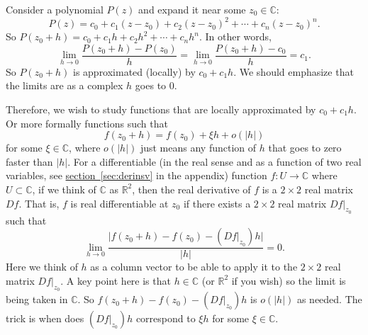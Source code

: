 \documentclass[12pt,openany]{book}
\newcommand{\sabs}[1]{\lvert {#1} \rvert}
\newcommand{\C}{{\mathbb{C}}}
\newcommand{\R}{{\mathbb{R}}}
\theoremstyle{plain}
\theoremstyle{remark}
\theoremstyle{definition}
\theoremstyle{exercise}
\theoremstyle{example}
\newcommand{\sectionref}[1]{\hyperref[#1]{section~\ref*{#1}}}
\begin{document}
Consider a polynomial $P(z)$ and expand it near some $z_0 \in \C$:
\begin{equation*}
P(z) = c_0 + c_1 (z-z_0) + c_2 {(z-z_0)}^2 + \cdots + c_n {(z-z_0)}^n .
\end{equation*}
So $P(z_0+h) = c_0 + c_1 h + c_2 h^2 + \cdots + c_n h^n$.
In other words,
\begin{equation*}
\lim_{h \to 0} \frac{P(z_0+h) - P(z_0)}{h} =
\lim_{h \to 0} \frac{P(z_0+h) - c_0}{h} = c_1 .
\end{equation*}
So $P(z_0+h)$ is approximated (locally) by $c_0 + c_1 h$.
We should emphasize that the limits are as a complex $h$ goes to 0.

Therefore, we wish to study functions that are
locally approximated by $c_0 + c_1 h$.  Or more formally functions
such that
\begin{equation*}
f(z_0+h) = f(z_0) + \xi h + o(\sabs{h})
\end{equation*}
for some $\xi \in \C$, where $o(\sabs{h})$ just means any function of $h$
that goes to zero faster than $\sabs{h}$.
For a differentiable (in the real sense
and as a function of two real variables,
see \sectionref{sec:derinsv} in the appendix) function $f \colon U \to
\C$ where $U \subset \C$, if we think of $\C$ as $\R^2$,
then the real derivative of $f$ is a $2 \times 2$ real matrix $D f$.
That is, $f$ is real differentiable at $z_0$ if there exists
a $2 \times 2$ real matrix $Df|_{z_0}$ such that
\begin{equation*}
\lim_{h \to 0} \frac{\sabs{f(z_0+h) - f(z_0) - (Df|_{z_0}) h}}{\sabs{h}} = 0 .
\end{equation*}
Here we think of $h$ as a column vector to be able to apply it to the
$2 \times 2$ real matrix $Df|_{z_0}$.
A key point here is that $h \in \C$ (or $\R^2$ if you wish)
so the limit is being taken in $\C$.
So $f(z_0+h) - f(z_0) - (Df|_{z_0}) h$ is $o(\sabs{h})$ as needed.
The trick is when does $(Df|_{z_0}) h$ correspond to $\xi h$ for some $\xi \in
\C$.
\end{document}
